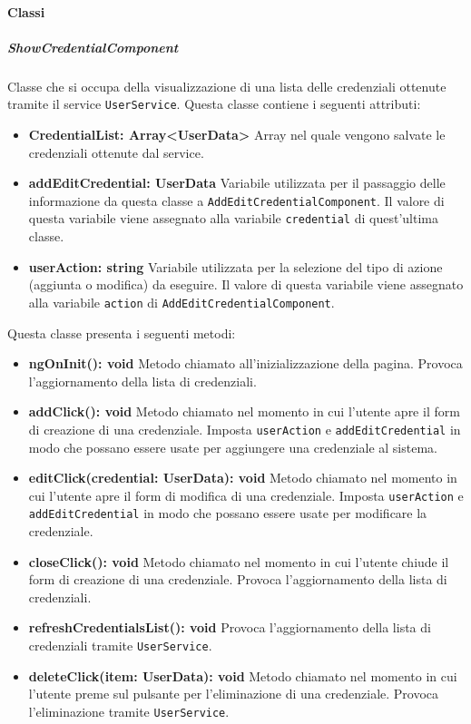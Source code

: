 \paragraph{Classi}
\subparagraph{ShowCredentialComponent}
Classe che si occupa della visualizzazione di una lista delle credenziali ottenute tramite il service \texttt{UserService}. \newline
Questa classe contiene i seguenti attributi:
\begin{itemize}
	\item \textbf{CredentialList: Array<UserData>} \newline
	Array nel quale vengono salvate le credenziali ottenute dal service.
	\item \textbf{addEditCredential: UserData} \newline
	Variabile utilizzata per il passaggio delle informazione da questa classe a \texttt{AddEditCredentialComponent}. Il valore di questa variabile viene assegnato alla variabile \texttt{credential} di quest'ultima classe.
	\item \textbf{userAction: string} \newline
	Variabile utilizzata per la selezione del tipo di azione (aggiunta o modifica) da eseguire. Il valore di questa variabile viene assegnato alla variabile \texttt{action} di \texttt{AddEditCredentialComponent}.
\end{itemize}
Questa classe presenta i seguenti metodi:
\begin{itemize}
	\item \textbf{ngOnInit(): void} \newline
	Metodo chiamato all'inizializzazione della pagina. Provoca l'aggiornamento della lista di credenziali.
	\item \textbf{addClick(): void} \newline
	Metodo chiamato nel momento in cui l'utente apre il form di creazione di una credenziale. Imposta \texttt{userAction} e \texttt{addEditCredential} in modo che possano essere usate per aggiungere una credenziale al sistema.
	\item \textbf{editClick(credential: UserData): void} \newline
	Metodo chiamato nel momento in cui l'utente apre il form di modifica di una credenziale. Imposta \texttt{userAction} e \texttt{addEditCredential} in modo che possano essere usate per modificare la credenziale.
	\item \textbf{closeClick(): void} \newline
	Metodo chiamato nel momento in cui l'utente chiude il form di creazione di una credenziale. Provoca l'aggiornamento della lista di credenziali.
	\item \textbf{refreshCredentialsList(): void} \newline
	Provoca l'aggiornamento della lista di credenziali tramite \texttt{UserService}.
	\item \textbf{deleteClick(item: UserData): void} \newline
	Metodo chiamato nel momento in cui l'utente preme sul pulsante per l'eliminazione di una credenziale. Provoca l'eliminazione tramite \texttt{UserService}.
\end{itemize}
